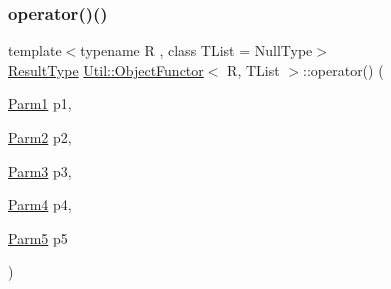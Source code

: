 \subsubsection{\texorpdfstring{operator()()}{operator()()}\hspace{0.1cm}{\footnotesize\ttfamily [16/18]}}
{\footnotesize\ttfamily template$<$typename R , class T\+List  = Null\+Type$>$ \\
\mbox{\hyperlink{classUtil_1_1ObjectFunctor_a77f816e98108848347d0dfc085090a1c}{Result\+Type}} \mbox{\hyperlink{classUtil_1_1ObjectFunctor}{Util\+::\+Object\+Functor}}$<$ R, T\+List $>$\+::operator() (\begin{DoxyParamCaption}\item[{\mbox{\hyperlink{classUtil_1_1ObjectFunctor_a199715d28029627c2ae7219c13b04d26}{Parm1}}}]{p1,  }\item[{\mbox{\hyperlink{classUtil_1_1ObjectFunctor_a6809cf65883dc7575e01d9b9849649cf}{Parm2}}}]{p2,  }\item[{\mbox{\hyperlink{classUtil_1_1ObjectFunctor_a6becd26610c6091b9ba93cd96f3def66}{Parm3}}}]{p3,  }\item[{\mbox{\hyperlink{classUtil_1_1ObjectFunctor_a54ce0b64981cd7f558ce8eea7df3f1b2}{Parm4}}}]{p4,  }\item[{\mbox{\hyperlink{classUtil_1_1ObjectFunctor_a8428e04dd3fb91bc7f7c518a1771eecb}{Parm5}}}]{p5 }\end{DoxyParamCaption})\hspace{0.3cm}{\ttfamily [inline]}}

\mbox{\label{classUtil_1_1ObjectFunctor_a95b7e08a92f54e2ce8a90153c1414abd}} 
